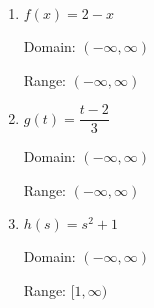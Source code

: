 \documentclass{ximera}
\begin{document}
\begin{enumerate}


\item 

$f(x) =2-x$

Domain: $(-\infty, \infty)$ 

Range:  $(-\infty, \infty)$





\item  

$g(t) = \dfrac{t - 2}{3}$

Domain: $(-\infty, \infty)$ 

Range: $(-\infty, \infty)$  

 

%  




\item 

$h(s) = s^2+1$

Domain: $(-\infty, \infty)$ 

Range:  $[1, \infty)$

 

 



\end{enumerate}
\end{document}
